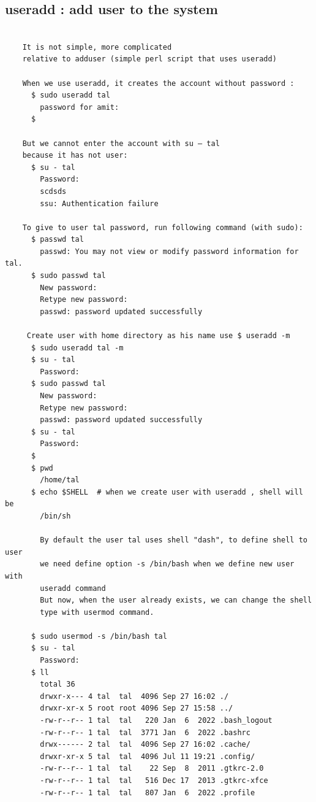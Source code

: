 \documentclass[a4paper,12pt]{article}
\begin{document}
\subsection{useradd   : add user to the system}
\begin{verbatim}
    
    It is not simple, more complicated
    relative to adduser (simple perl script that uses useradd)

    When we use useradd, it creates the account without password : 
﻿      $ sudo useradd tal
        password for amit:       
      $ 

    But we cannot enter the account with su – tal 
    because it has not user: 
﻿      $ su - tal
        Password: 
        scdsds
        ssu: Authentication failure

    To give to user tal password, run following command (with sudo):
﻿      $ passwd tal
        passwd: You may not view or modify password information for tal.
      $ sudo passwd tal
        New password: 
        Retype new password: 
        passwd: password updated successfully
        
     Create user with home directory as his name use $ useradd -m   
      $ sudo useradd tal -m
      $ su - tal
        Password: 
      $ sudo passwd tal
        New password: 
        Retype new password: 
        passwd: password updated successfully
﻿      $ su - tal
        Password: 
      $ 
      $ pwd
        /home/tal
      $ echo $SHELL  # when we create user with useradd , shell will be 
        /bin/sh 
   
        By default the user tal uses shell "dash", to define shell to user 
        we need define option -s /bin/bash when we define new user with 
        useradd command
        But now, when the user already exists, we can change the shell 
        type with usermod command.

      $ sudo usermod -s /bin/bash tal           
      $ su - tal
        Password: 
      $ ll
        total 36
        drwxr-x--- 4 tal  tal  4096 Sep 27 16:02 ./
        drwxr-xr-x 5 root root 4096 Sep 27 15:58 ../
        -rw-r--r-- 1 tal  tal   220 Jan  6  2022 .bash_logout
        -rw-r--r-- 1 tal  tal  3771 Jan  6  2022 .bashrc
        drwx------ 2 tal  tal  4096 Sep 27 16:02 .cache/
        drwxr-xr-x 5 tal  tal  4096 Jul 11 19:21 .config/
        -rw-r--r-- 1 tal  tal    22 Sep  8  2011 .gtkrc-2.0
        -rw-r--r-- 1 tal  tal   516 Dec 17  2013 .gtkrc-xfce
        -rw-r--r-- 1 tal  tal   807 Jan  6  2022 .profile   
        

\end{verbatim}
\end{document}

